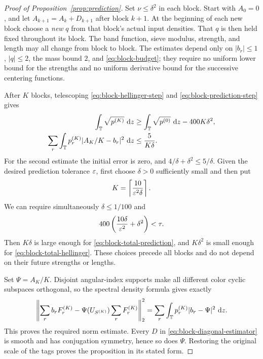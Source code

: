 \begin{proof}[Proof of Proposition~\ref{prop:prediction}]
Set $\nu\le\delta^2$ in each block.  Start with $A_0=0$, and let
$A_{k+1}=A_k+D_{k+1}$ after block $k+1$.  At the beginning of each
new block choose a \emph{new} $q$ from that block's actual input
densities.  That $q$ is then held fixed throughout its block.
The band function, sieve modulus, strength, and length may all
change from block to block.  The estimates depend only on
$|b_r|\le1$, $|q|\le2$, the mass bound $2$, and
\eqref{eq:block-budget}; they require no uniform lower bound for
the strengths and no uniform derivative bound for the successive
centering functions.

After $K$ blocks, telescoping
\eqref{eq:block-hellinger-step} and
\eqref{eq:block-prediction-step} gives
\begin{align}
 \int_\mathbb T\sqrt{p^{(K)}}\,\,\mathrm d z
 &\ge\int_\mathbb T\sqrt{p^{(0)}}\,\,\mathrm d z-400K\delta^2,
 \label{eq:block-total-hellinger}\\
 \sum_r\int_\mathbb T p_r^{(K)}
       |A_K/K-b_r|^2\,\,\mathrm d z
 &\le\frac5{K\delta}.
 \label{eq:block-total-prediction}
\end{align}
For the second estimate the initial error is zero, and
$4/\delta+\delta^2\le5/\delta$.
Given the desired prediction tolerance $\varepsilon$, first choose
$\delta>0$ sufficiently small and then put
\[
 K=\left\lceil\frac{10}{\varepsilon^2\delta}\right\rceil.
\]
We can require simultaneously $\delta\le1/100$ and
\[
 400\left(\frac{10\delta}{\varepsilon^2}+\delta^2\right)<\tau.
\]
Then $K\delta$ is large enough for
\eqref{eq:block-total-prediction}, and $K\delta^2$ is small enough
for \eqref{eq:block-total-hellinger}.  These choices precede all
blocks and do not depend on their future strengths or lengths.

Set $\Psi=A_K/K$.  Disjoint angular-index supports make all
different color cyclic subspaces orthogonal, so the spectral
density formula gives exactly
\[
 \left\|\sum_r b_rF_r^{(K)}-
          \Psi(U_{S^{(K)}})\sum_rF_r^{(K)}\right\|_2^2
 =\sum_r\int_\mathbb T p_r^{(K)}|b_r-\Psi|^2\,\,\mathrm d z.
\]
This proves the required norm estimate.  Every $D$ in
\eqref{eq:block-diagonal-estimator} is smooth and has conjugation
symmetry, hence so does $\Psi$.  Restoring the original scale of
the tags proves the proposition in its stated form.
\end{proof}

